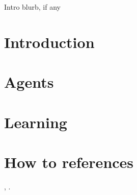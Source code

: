 
Intro blurb, if any

\section{Introduction}
\lipsum[1-2]


\section{Agents}
\lipsum

\section{Learning}
\lipsum

\section{How to references}
\citep{R}, \citep{ihaka:1996}.



\address{Jaan van Doe\\
  Dept. of Informatics\\
  Universiteit Utrecht\\
  The Netherlands\\}

